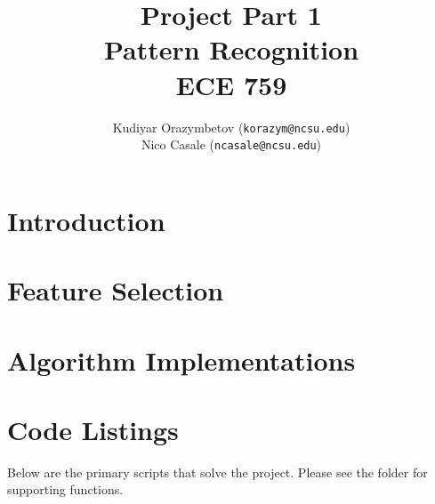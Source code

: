 \documentclass[]{ncmathy}
\newcommand{\theassignment}{Project Part 1}
\newcommand{\thecourse}{Pattern Recognition\\ECE 759}
\begin{document}
\title{\theassignment\\\thecourse}
\author{Kudiyar Orazymbetov (\texttt{korazym@ncsu.edu})\\Nico Casale (\texttt{ncasale@ncsu.edu})}

\makeFancyTitle

\tableofcontents
\listoffigures
\lstlistoflistings

\pagebreak

\section{Introduction} 
	

\section{Feature Selection}
	

\section{Algorithm Implementations}
	
	




\section{Code Listings}

Below are the primary scripts that solve the project. Please see the
 folder for supporting functions.

%
\end{document}
